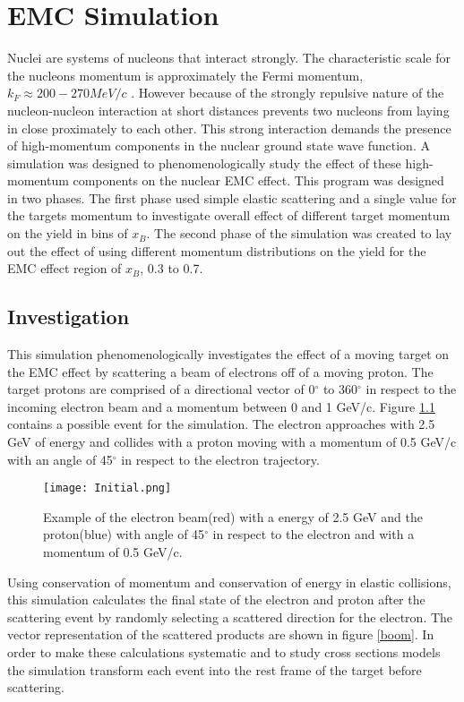 
\chapter{EMC Simulation}Nuclei are systems of nucleons that interact strongly. The characteristic scale for the nucleons momentum is approximately the Fermi momentum, $k_F \approx 200-270 MeV/c$ \cite{gomez}. However because of the strongly repulsive nature of the nucleon-nucleon interaction at short distances prevents two nucleons from laying in close proximately to each other. This strong interaction demands the presence of high-momentum components in the nuclear ground state wave function. A simulation was designed to phenomenologically study the effect of these high-momentum components on the nuclear EMC effect. This program was designed in two phases. The first phase used simple elastic scattering and a single value for the targets momentum to investigate overall effect of different target momentum on the yield in bins of $x_B$. The second phase of the simulation was created to lay out the effect of using different momentum distributions on the yield for the EMC effect region of $x_B$, 0.3 to 0.7.
\section{Investigation} This simulation phenomenologically investigates the effect of a moving target on the EMC effect by scattering a beam of electrons off of a moving proton. The target protons are comprised of a directional vector of 0$^\circ$ to 360$^\circ$ in respect to the incoming electron beam and a momentum between 0 and 1 GeV/c. Figure \ref{example} contains a possible event for the simulation. The electron approaches with 2.5 GeV of energy and collides with a proton moving with a momentum of 0.5 GeV/c with an angle of 45$^\circ$ in respect to the electron trajectory. 
\begin{figure}[t]
\centering
\caption{Example of the electron beam(red) with a energy of 2.5 GeV and the proton(blue) with angle of 45$^\circ$ in respect to the electron and with a momentum of 0.5 GeV/c.}
\texttt{[image: Initial.png]}
\label{example}
\end{figure}

Using conservation of momentum and conservation of energy in elastic collisions, this simulation calculates the final state of the electron and proton after the scattering event by randomly selecting a scattered direction for the electron. The vector representation of the scattered products are shown in figure \ref{boom}. In order to make these calculations systematic and to study cross sections models the simulation transform each event into the rest frame of the target before scattering. 

